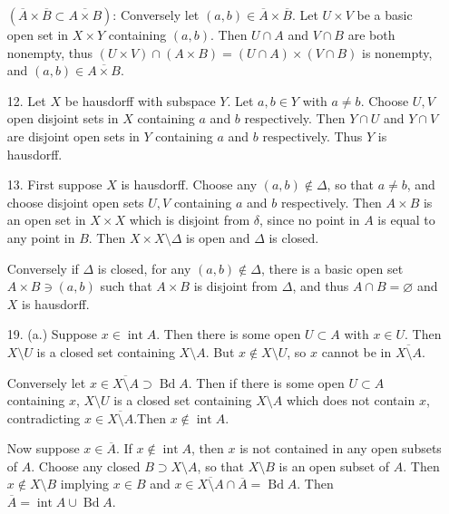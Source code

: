 \documentclass[11pt, reqno]{article}
\theoremstyle{plain}
\theoremstyle{definition}
\theoremstyle{remark}
\renewcommand{\emptyset}{\varnothing}
\begin{document}
\begin{enumerate}
    $(\overline{A} \times \overline{B} \subset \overline{A \times B})$: 
    Conversely let $(a,b) \in \overline{A} \times\overline{B}$. Let $U \times V$ be 
    a basic open set in $X \times Y$ containing $(a,b)$. Then $U \cap A$ and $V \cap B$
    are both nonempty, thus $(U \times V) \cap (A \times B) = (U \cap A) \times (V \cap B)$
    is nonempty, and $(a,b) \in \overline{A \times B}$.

    \item[12.] Let $X$ be hausdorff with subspace $Y$. Let $a, b \in Y$ with $a \neq b$. 
    Choose $U, V$ open disjoint sets in $X$ containing $a$ and $b$ respectively. Then
    $Y \cap U$ and $Y \cap V$ are disjoint open sets in $Y$ containing $a$ and $b$ respectively.
    Thus $Y$ is hausdorff.

    \item[13.] First suppose $X$ is hausdorff. Choose any $(a,b) \notin \Delta$, so
    that $a \neq b$, and choose disjoint open sets $U, V$ containing $a$ and $b$ respectively.
    Then $A \times B$ is an open set in $X \times X$ which is disjoint from $\delta$, since 
    no point in $A$ is equal to any point in $B$. Then $X \times X \setminus \Delta$ is open and 
    $\Delta$ is closed.

    Conversely if $\Delta$ is closed, for any $(a,b) \notin \Delta$, there is a basic open set 
    $A \times B \ni (a,b)$ such that $A \times B$ is disjoint from $\Delta$, and thus 
    $A \cap B = \emptyset$ and $X$ is hausdorff. 

    \item[19.] (a.) Suppose $x \in \operatorname{int}A$. Then there is some open $U \subset A$ with 
    $x \in U$. Then $X \setminus U$ is a closed set containing $X \setminus A$. But $x \notin X\setminus U$,
    so $x$ cannot be in $\overline{X \setminus A}$.

    Conversely let $x \in \overline{X \setminus A} \supset \operatorname{Bd}A$. Then if there is some open $U \subset A$ containing $x$,
    $X \setminus U$ is a closed set containing $X \setminus A$ which does not contain $x$, contradicting
    $x \in \overline{X \setminus A}$.Then $x \notin \operatorname{int} A$.

    Now suppose $x \in \overline{A}$. If $x \notin \operatorname{int}A$, then $x$ is not contained 
    in any open subsets of $A$. Choose any closed $B \supset X\setminus A$, so that $X \setminus B$
    is an open subset of $A$. Then $x \notin X \setminus B$ implying $x \in B$ and $x \in \overline{X \setminus A} \cap \overline{A} =
    \operatorname{Bd} A$. Then $\overline{A} = \operatorname{int} A \cup \operatorname{Bd} A$.


\end{enumerate}
\end{document}
